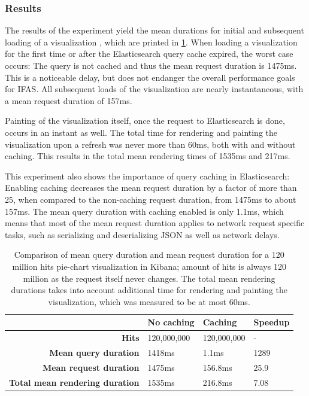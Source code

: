 \subsubsection{Results}

The results of the experiment yield the mean durations for initial and subsequent loading of a visualization , which are printed in \cref{table:kibana-config-comparison}.
When loading a visualization for the first time or after the Elasticsearch query cache expired, the worst case occurs: The query is not cached and thus the mean request duration is 1475ms.
This is a noticeable delay, but does not endanger the overall performance goals for \ac{IFAS}.
All subsequent loads of the visualization are nearly instantaneous, with a mean request duration of 157ms.

Painting of the visualization itself, once the request to Elasticsearch is done, occurs in an instant as well.
The total time for rendering and painting the visualization upon a refresh was never more than 60ms, both with and without caching.
This results in the total mean rendering times of 1535ms and 217ms.

This experiment also shows the importance of query caching in Elasticsearch:
Enabling caching decreases the mean request duration by a factor of more than 25, when compared to the non-caching request duration, from 1475ms to about 157ms.
The mean query duration with caching enabled is only 1.1ms, which means that most of the mean request duration applies to network request specific tasks, such as serializing and deserializing JSON as well as network delays.

\begin{table}
\caption[Comparison of mean query duration and mean request duration for a 120 million hits pie-chart visualization in Kibana]{
Comparison of mean query duration and mean request duration for a 120 million hits pie-chart visualization in Kibana; amount of hits is always 120 million as the request itself never changes. The total mean rendering durations takes into account additional time for rendering and painting the visualization, which was measured to be at most 60ms.}
\label{table:kibana-config-comparison}
\centering
\begin{tabular}{r|l|l|l}
& \textbf{No caching}                                      & \textbf{Caching} & \textbf{Speedup} \\ \hline
\textbf{Hits} & 120,000,000 & 120,000,000 & - \\ \hline
\textbf{Mean query duration} & 1418ms & 1.1ms & 1289 \\ \hline
\textbf{Mean request duration} & 1475ms & 156.8ms & 25.9 \\ \hline
\textbf{Total mean rendering duration} & 1535ms & 216.8ms & 7.08 \\

\end{tabular}
\end{table}



